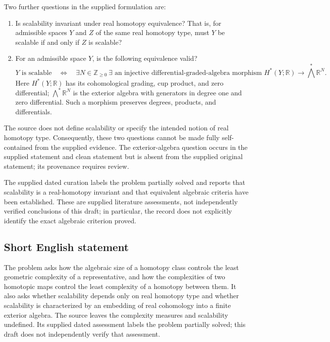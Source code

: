\documentclass[11pt]{article}
\newcommand{\Z}{\mathbb{Z}}
\newcommand{\R}{\mathbb{R}}
\begin{document}
Two further questions in the supplied formulation are:
\begin{enumerate}
\item Is scalability invariant under real homotopy equivalence? That is, for admissible spaces \(Y\) and \(Z\) of the same real homotopy type, must \(Y\) be scalable if and only if \(Z\) is scalable?
\item For an admissible space \(Y\), is the following equivalence valid?
\[
Y\text{ is scalable}
\quad\Longleftrightarrow\quad
\exists N\in\Z_{\geq0}\ \exists\text{ an injective differential-graded-algebra morphism }
H^*(Y;\R)\longrightarrow\bigwedge^*\R^N.
\]
Here \(H^*(Y;\R)\) has its cohomological grading, cup product, and zero differential; \(\bigwedge^*\R^N\) is the exterior algebra with generators in degree one and zero differential. Such a morphism preserves degrees, products, and differentials.
\end{enumerate}
The source does not define scalability or specify the intended notion of real homotopy type. Consequently, these two questions cannot be made fully self-contained from the supplied evidence. The exterior-algebra question occurs in the supplied statement and clean statement but is absent from the supplied original statement; its provenance requires review.

The supplied dated curation labels the problem partially solved and reports that scalability is a real-homotopy invariant and that equivalent algebraic criteria have been established. These are supplied literature assessments, not independently verified conclusions of this draft; in particular, the record does not explicitly identify the exact algebraic criterion proved.
\subsection{Short English statement}
The problem asks how the algebraic size of a homotopy class controls the least geometric complexity of a representative, and how the complexities of two homotopic maps control the least complexity of a homotopy between them. It also asks whether scalability depends only on real homotopy type and whether scalability is characterized by an embedding of real cohomology into a finite exterior algebra. The source leaves the complexity measures and scalability undefined. Its supplied dated assessment labels the problem partially solved; this draft does not independently verify that assessment.
\end{document}
